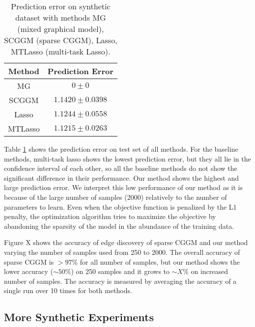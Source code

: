 \documentclass{article}
\begin{document}
\begin{table}
    \label{table:syn_pred_err}
    	\caption{Prediction error on synthetic dataset with methods MG (mixed graphical model), SCGGM (sparse CGGM), Lasso, MTLasso (multi-task Lasso).}
\begin{center}
    \begin{tabular}{| c | c |}
    \hline
    Method & Prediction Error \\
    \hline
    MG & $0 \pm 0$ \\
    SCGGM & $1.1420 \pm 0.0398$  \\
    Lasso & $1.1244 \pm 0.0558$  \\
    MTLasso & $1.1215 \pm 0.0263$ \\
    \hline 
    \end{tabular}
\end{center}
\end{table}
Table \ref{table:syn_pred_err} shows the prediction error on test set of all methods. For the baseline methods, multi-task lasso shows the lowest prediction error, but they all lie in the confidence interval of each other, so all the baseline methods do not show the significant difference in their performance. Our method shows the highest and large prediction error. We interpret this low performance of our method as it is because of the large number of samples (2000) relatively to the number of parameters to learn. Even when the objective function is penalized by the L1 penalty, the optimization algorithm tries to maximize the objective by abandoning the sparsity of the model in the abundance of the training data.

Figure X shows the accuracy of edge discovery of sparse CGGM and our method varying the number of samples used from 250 to 2000. The overall accuracy of sparse CGGM is $> 97\%$ for all number of samples, but our method shows the lower accuracy ($\sim 50\%$) on 250 samples and it grows to $\sim X\%$ on increased number of samples. The accuracy is measured by averaging the accuracy of a single run over 10 times for both methods.

\subsection{More Synthetic Experiments}
\end{document}

